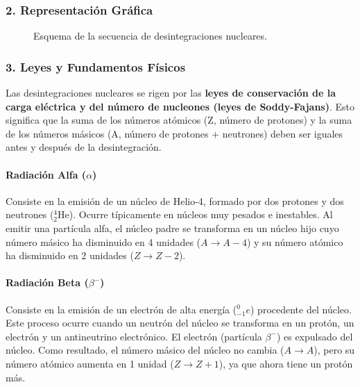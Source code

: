 \subsubsection*{2. Representación Gráfica}
\begin{figure}[H]
    \centering
    \caption{Esquema de la secuencia de desintegraciones nucleares.}
\end{figure}

\subsubsection*{3. Leyes y Fundamentos Físicos}
Las desintegraciones nucleares se rigen por las \textbf{leyes de conservación de la carga eléctrica y del número de nucleones (leyes de Soddy-Fajans)}. Esto significa que la suma de los números atómicos (Z, número de protones) y la suma de los números másicos (A, número de protones + neutrones) deben ser iguales antes y después de la desintegración.

\paragraph*{Radiación Alfa ($\alpha$)}
Consiste en la emisión de un núcleo de Helio-4, formado por dos protones y dos neutrones (${}_{2}^{4}\text{He}$). Ocurre típicamente en núcleos muy pesados e inestables. Al emitir una partícula alfa, el núcleo padre se transforma en un núcleo hijo cuyo número másico ha disminuido en 4 unidades ($A \to A-4$) y su número atómico ha disminuido en 2 unidades ($Z \to Z-2$).

\paragraph*{Radiación Beta ($\beta^-$)}
Consiste en la emisión de un electrón de alta energía (${}_{-1}^{0}e$) procedente del núcleo. Este proceso ocurre cuando un neutrón del núcleo se transforma en un protón, un electrón y un antineutrino electrónico. El electrón (partícula $\beta^-$) es expulsado del núcleo. Como resultado, el número másico del núcleo no cambia ($A \to A$), pero su número atómico aumenta en 1 unidad ($Z \to Z+1$), ya que ahora tiene un protón más.

